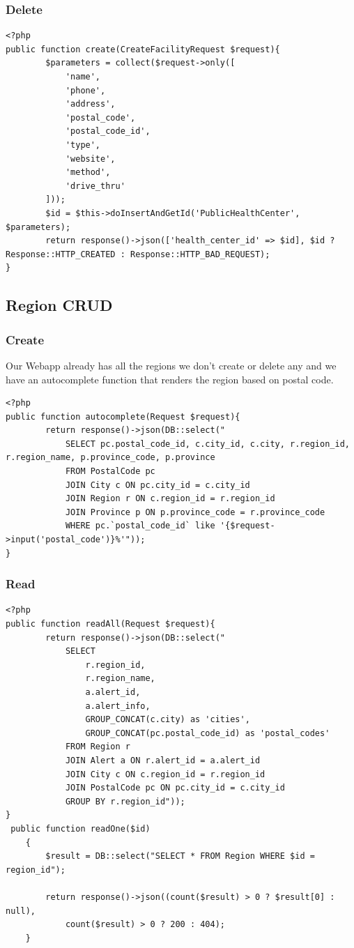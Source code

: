 \subsubsection{Delete}
\begin{verbatim}
<?php
public function create(CreateFacilityRequest $request){
        $parameters = collect($request->only([
            'name',
            'phone',
            'address',
            'postal_code',
            'postal_code_id',
            'type',
            'website',
            'method',
            'drive_thru'
        ]));
        $id = $this->doInsertAndGetId('PublicHealthCenter', $parameters);
        return response()->json(['health_center_id' => $id], $id ? Response::HTTP_CREATED : Response::HTTP_BAD_REQUEST);
}
\end{verbatim}
\subsection{Region CRUD}
\subsubsection{Create}
Our Webapp already has all the regions we don't create or delete any and we have an autocomplete function that renders the region based on postal code.
\begin{verbatim}
<?php
public function autocomplete(Request $request){
        return response()->json(DB::select("
            SELECT pc.postal_code_id, c.city_id, c.city, r.region_id, r.region_name, p.province_code, p.province
            FROM PostalCode pc
            JOIN City c ON pc.city_id = c.city_id
            JOIN Region r ON c.region_id = r.region_id
            JOIN Province p ON p.province_code = r.province_code
            WHERE pc.`postal_code_id` like '{$request->input('postal_code')}%'"));
}
\end{verbatim}
\subsubsection{Read}
\begin{verbatim}
<?php
public function readAll(Request $request){
        return response()->json(DB::select("
            SELECT
                r.region_id,
                r.region_name,
                a.alert_id,
                a.alert_info,
                GROUP_CONCAT(c.city) as 'cities',
                GROUP_CONCAT(pc.postal_code_id) as 'postal_codes'
            FROM Region r
            JOIN Alert a ON r.alert_id = a.alert_id
            JOIN City c ON c.region_id = r.region_id
            JOIN PostalCode pc ON pc.city_id = c.city_id
            GROUP BY r.region_id"));
}
 public function readOne($id)
    {
        $result = DB::select("SELECT * FROM Region WHERE $id = region_id");

        return response()->json((count($result) > 0 ? $result[0] : null),
            count($result) > 0 ? 200 : 404);
    }
    
\end{verbatim}

